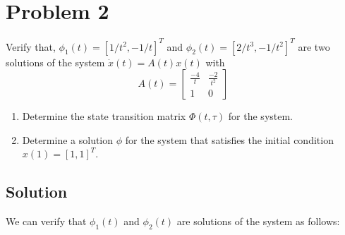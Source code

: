 \section*{Problem 2}

Verify that, \( \phi_1(t) = [1/t^2, -1/t]^T \) and \( \phi_2(t) = [2/t^3, -1/t^2]^T \) are two solutions of the system \( \dot x(t) = A(t)x(t) \) with
\begin{equation*}
    A(t)
    =
    \begin{bmatrix}
        \frac{-4}{t} & \frac{-2}{t^2} \\
        1            & 0
    \end{bmatrix}
\end{equation*}

\begin{enumerate}[label= (\alph*)]
    \item Determine the state transition matrix \( \Phi(t,\tau) \) for the system.
    \item Determine a solution \( \phi \) for the system that satisfies the initial condition \( x(1) = {[1, 1]}^T \).
\end{enumerate}

\subsection*{Solution}

We can verify that \( \phi_1(t) \) and \( \phi_2(t) \) are solutions of the system as follows:

